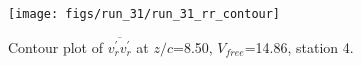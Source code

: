 \begin{figure}[H]
\centering
\texttt{[image: figs/run\_31/run\_31\_rr\_contour]}
\caption{Contour plot of $\overline{v_{r}^{\prime} v_{r}^{\prime}}$ at $z/c$=8.50, $V_{free}$=14.86, station 4.}
\label{fig:run_31_rr_contour}
\end{figure}


